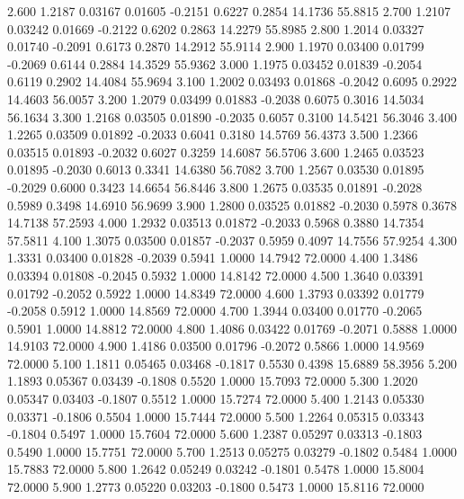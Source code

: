    2.600   1.2187   0.03167   0.01605  -0.2151   0.6227   0.2854  14.1736  55.8815
   2.700   1.2107   0.03242   0.01669  -0.2122   0.6202   0.2863  14.2279  55.8985
   2.800   1.2014   0.03327   0.01740  -0.2091   0.6173   0.2870  14.2912  55.9114
   2.900   1.1970   0.03400   0.01799  -0.2069   0.6144   0.2884  14.3529  55.9362
   3.000   1.1975   0.03452   0.01839  -0.2054   0.6119   0.2902  14.4084  55.9694
   3.100   1.2002   0.03493   0.01868  -0.2042   0.6095   0.2922  14.4603  56.0057
   3.200   1.2079   0.03499   0.01883  -0.2038   0.6075   0.3016  14.5034  56.1634
   3.300   1.2168   0.03505   0.01890  -0.2035   0.6057   0.3100  14.5421  56.3046
   3.400   1.2265   0.03509   0.01892  -0.2033   0.6041   0.3180  14.5769  56.4373
   3.500   1.2366   0.03515   0.01893  -0.2032   0.6027   0.3259  14.6087  56.5706
   3.600   1.2465   0.03523   0.01895  -0.2030   0.6013   0.3341  14.6380  56.7082
   3.700   1.2567   0.03530   0.01895  -0.2029   0.6000   0.3423  14.6654  56.8446
   3.800   1.2675   0.03535   0.01891  -0.2028   0.5989   0.3498  14.6910  56.9699
   3.900   1.2800   0.03525   0.01882  -0.2030   0.5978   0.3678  14.7138  57.2593
   4.000   1.2932   0.03513   0.01872  -0.2033   0.5968   0.3880  14.7354  57.5811
   4.100   1.3075   0.03500   0.01857  -0.2037   0.5959   0.4097  14.7556  57.9254
   4.300   1.3331   0.03400   0.01828  -0.2039   0.5941   1.0000  14.7942  72.0000
   4.400   1.3486   0.03394   0.01808  -0.2045   0.5932   1.0000  14.8142  72.0000
   4.500   1.3640   0.03391   0.01792  -0.2052   0.5922   1.0000  14.8349  72.0000
   4.600   1.3793   0.03392   0.01779  -0.2058   0.5912   1.0000  14.8569  72.0000
   4.700   1.3944   0.03400   0.01770  -0.2065   0.5901   1.0000  14.8812  72.0000
   4.800   1.4086   0.03422   0.01769  -0.2071   0.5888   1.0000  14.9103  72.0000
   4.900   1.4186   0.03500   0.01796  -0.2072   0.5866   1.0000  14.9569  72.0000
   5.100   1.1811   0.05465   0.03468  -0.1817   0.5530   0.4398  15.6889  58.3956
   5.200   1.1893   0.05367   0.03439  -0.1808   0.5520   1.0000  15.7093  72.0000
   5.300   1.2020   0.05347   0.03403  -0.1807   0.5512   1.0000  15.7274  72.0000
   5.400   1.2143   0.05330   0.03371  -0.1806   0.5504   1.0000  15.7444  72.0000
   5.500   1.2264   0.05315   0.03343  -0.1804   0.5497   1.0000  15.7604  72.0000
   5.600   1.2387   0.05297   0.03313  -0.1803   0.5490   1.0000  15.7751  72.0000
   5.700   1.2513   0.05275   0.03279  -0.1802   0.5484   1.0000  15.7883  72.0000
   5.800   1.2642   0.05249   0.03242  -0.1801   0.5478   1.0000  15.8004  72.0000
   5.900   1.2773   0.05220   0.03203  -0.1800   0.5473   1.0000  15.8116  72.0000
